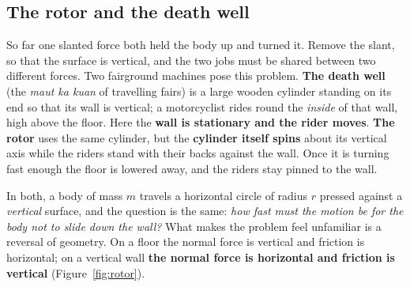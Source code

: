 \subsection{The rotor and the death well}\label{sub:rotor}
So far one slanted force both held the body up and turned it. Remove the slant, so that the surface is
vertical, and the two jobs must be shared between two different forces. Two fairground machines pose this problem.
\textbf{The death well} (the \emph{maut ka kuan} of travelling fairs) is a large wooden cylinder
standing on its end so that its wall is vertical; a motorcyclist rides round the
\emph{inside} of that wall, high above the floor. Here the \textbf{wall is stationary and the rider
moves}. \textbf{The rotor} uses the same cylinder, but the \textbf{cylinder itself
spins} about its vertical axis while the riders stand with their backs against the wall. Once it is
turning fast enough the floor is lowered away, and the riders stay pinned to the wall.

In both, a body of mass $m$ travels a horizontal circle of radius $r$ pressed against a \emph{vertical}
surface, and the question is the same: \emph{how fast must the motion be for the body not to slide down
the wall?} What makes the problem feel unfamiliar is a reversal of geometry. On a floor the normal force
is vertical and friction is horizontal; on a vertical wall \textbf{the normal force is horizontal and
friction is vertical} (Figure~\ref{fig:rotor}).

\begin{figure}[htbp]
\centering
{}
\end{figure}


